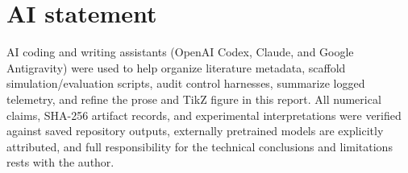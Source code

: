 \documentclass{article}
\begin{document}
\section{AI statement}

AI coding and writing assistants (OpenAI Codex, Claude, and Google Antigravity) were used to help organize literature metadata, scaffold simulation/evaluation scripts, audit control harnesses, summarize logged telemetry, and refine the prose and TikZ figure in this report. All numerical claims, SHA-256 artifact records, and experimental interpretations were verified against saved repository outputs, externally pretrained models are explicitly attributed, and full responsibility for the technical conclusions and limitations rests with the author.


\end{document}
